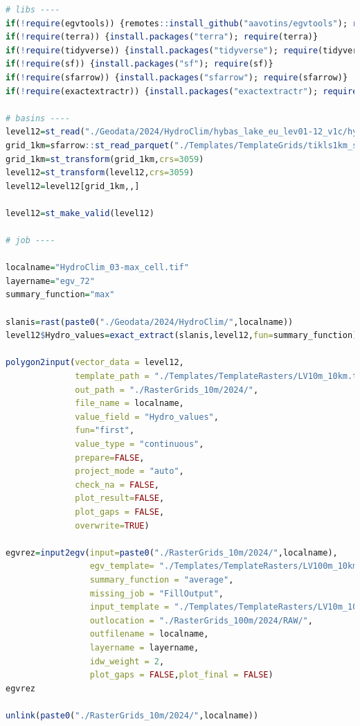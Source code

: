 \documentclass[
]{book}
\begin{document}
\begin{lstlisting}[language=R]
# libs ----
if(!require(egvtools)) {remotes::install_github("aavotins/egvtools"); require(egvtools)}
if(!require(terra)) {install.packages("terra"); require(terra)}
if(!require(tidyverse)) {install.packages("tidyverse"); require(tidyverse)}
if(!require(sf)) {install.packages("sf"); require(sf)}
if(!require(sfarrow)) {install.packages("sfarrow"); require(sfarrow)}
if(!require(exactextractr)) {install.packages("exactextractr"); require(exactextractr)}

# basins ----
level12=st_read("./Geodata/2024/HydroClim/hybas_lake_eu_lev01-12_v1c/hybas_lake_eu_lev12_v1c.shp")
grid_1km=sfarrow::st_read_parquet("./Templates/TemplateGrids/tikls1km_sauzeme.parquet")
grid_1km=st_transform(grid_1km,crs=3059)
level12=st_transform(level12,crs=3059)
level12=level12[grid_1km,,]

level12=st_make_valid(level12)

# job ----

localname="HydroClim_03-max_cell.tif"
layername="egv_72"
summary_function="max"
  
slanis=rast(paste0("./Geodata/2024/HydroClim/",localname))
level12$Hydro_values=exact_extract(slanis,level12,fun=summary_function)
  
polygon2input(vector_data = level12,
              template_path = "./Templates/TemplateRasters/LV10m_10km.tif",
              out_path = "./RasterGrids_10m/2024/",
              file_name = localname,
              value_field = "Hydro_values",
              fun="first",
              value_type = "continuous",
              prepare=FALSE,
              project_mode = "auto",
              check_na = FALSE,
              plot_result=FALSE,
              plot_gaps = FALSE,
              overwrite=TRUE)
  
egvrez=input2egv(input=paste0("./RasterGrids_10m/2024/",localname),
                 egv_template= "./Templates/TemplateRasters/LV100m_10km.tif",
                 summary_function = "average",
                 missing_job = "FillOutput",
                 input_template = "./Templates/TemplateRasters/LV10m_10km.tif",
                 outlocation = "./RasterGrids_100m/2024/RAW/",
                 outfilename = localname,
                 layername = layername,
                 idw_weight = 2,
                 plot_gaps = FALSE,plot_final = FALSE)
egvrez
  
unlink(paste0("./RasterGrids_10m/2024/",localname))
\end{lstlisting}
\end{document}
